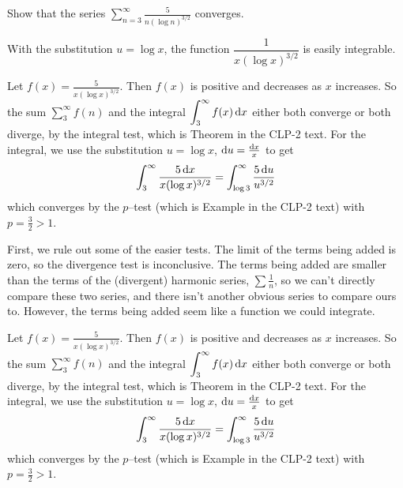 \begin{Mquestion}[2016Q5]
Show that the series $\displaystyle\sum_{n=3}^\infty \frac{5}{n(\log n)^{3/2}}$ converges.
\end{Mquestion}

\begin{hint}
With the substitution $u=\log x$, the function $\dfrac{1}{x(\log x)^{3/2}}$ is easily integrable.
\end{hint}

\begin{answer}
Let $\displaystyle f(x) = \frac{5}{x(\log x)^{3/2}}$.
Then $f(x)$ is positive and decreases as $x$ increases.
So the sum $\displaystyle\sum_3^{\infty} f(n)$ and the
integral $\displaystyle\int_3^\infty f(x) \,\mathrm{d}x$
either both converge or both diverge, by the integral test, which is
Theorem  in the CLP-2 text.
For the integral, we use the substitution
$u = \log x$, $\mathrm{d}u = \frac{\mathrm{d}x}{x}$ to get
\begin{align*}
\int_3^\infty \frac{5 \,\mathrm{d}x}{x(\log x)^{3/2}} = \int_{\log 3}^\infty \frac{5 \,\mathrm{d}u}{u^{3/2}}
\end{align*}
which converges by the $p$--test (which is
Example  in the CLP-2 text)
with $p=\frac{3}{2} > 1$.
\end{answer}

\begin{solution}
First, we rule out some of the easier tests. The limit of the terms being added is zero, so the divergence test is inconclusive. The terms being added are smaller than the terms of the (divergent) harmonic series, $\sum \frac{1}{n}$, so we can't directly compare these two series, and there isn't another obvious  series to compare ours to. However, the terms being added seem like a function we could integrate.

Let $\displaystyle f(x) = \frac{5}{x(\log x)^{3/2}}$.
Then $f(x)$ is positive and decreases as $x$ increases.
So the sum $\displaystyle\sum_3^{\infty} f(n)$ and the
integral $\displaystyle\int_3^\infty f(x) \,\mathrm{d}x$
either both converge or both diverge, by the integral test, which is
Theorem  in the CLP-2 text.
For the integral, we use the substitution
$u = \log x$, $\mathrm{d}u = \frac{\mathrm{d}x}{x}$ to get
\begin{align*}
\int_3^\infty \frac{5 \,\mathrm{d}x}{x(\log x)^{3/2}} = \int_{\log 3}^\infty \frac{5 \,\mathrm{d}u}{u^{3/2}}
\end{align*}
which converges by the $p$--test (which is
Example  in the CLP-2 text)
with $p=\frac{3}{2} > 1$.
\end{solution}

